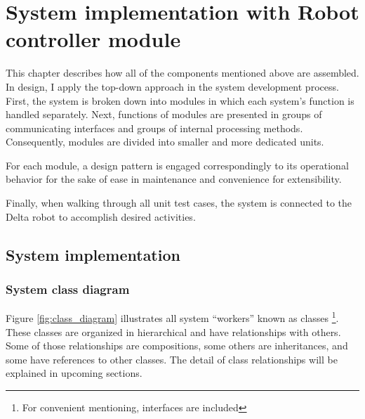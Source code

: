 \chapter{System implementation with Robot controller module}
\label{ch:implement}
\indent This chapter describes how all of the components mentioned above are assembled. In design, I apply the top-down approach in the system development process. First, the system is broken down into modules in which each system's function is handled separately. Next, functions of modules are presented in groups of communicating interfaces and groups of internal processing methods. Consequently, modules are divided into smaller and more dedicated units.

For each module, a design pattern is engaged correspondingly to its operational behavior for the sake of ease in maintenance and convenience for extensibility.

Finally, when walking through all unit test cases, the system is connected to the Delta robot to accomplish desired activities.

\section{System implementation}
\subsection{System class diagram}
Figure \ref{fig:class_diagram} illustrates all system ``workers'' known as classes \footnote{For convenient mentioning, interfaces are included}. These classes are organized in hierarchical and have relationships with others. Some of those relationships are compositions, some others are inheritances, and some have references to other classes. The detail of class relationships will be explained in upcoming sections.

